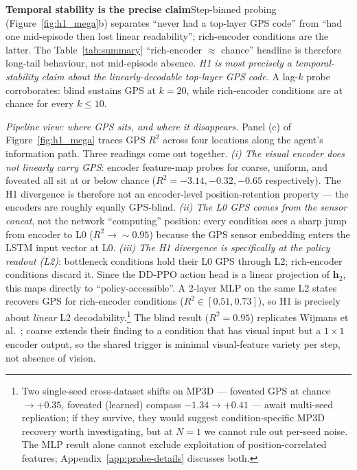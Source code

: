 \documentclass{article}
\newcommand{\pendnote}[1]{\footnote{\color{uncertaincol}\small #1}}
\begin{document}
\noindent\textbf{Temporal stability is the precise claim}\quad Step-binned probing (Figure~\ref{fig:h1_mega}b) separates ``never had a top-layer GPS code'' from ``had one mid-episode then lost linear readability''; rich-encoder conditions are the latter. The Table~\ref{tab:summary} ``rich-encoder $\approx$ chance'' headline is therefore long-tail behaviour, not mid-episode absence. \emph{H1 is most precisely a temporal-stability claim about the linearly-decodable top-layer GPS code.} A lag-$k$ probe corroborates: blind sustains GPS at $k=20$, while rich-encoder conditions are at chance for every $k \leq 10$.

\emph{Pipeline view: where GPS sits, and where it disappears.} Panel (c) of Figure~\ref{fig:h1_mega} traces GPS $R^2$ across four locations along the agent's information path. Three readings come out together. \emph{(i) The visual encoder does not linearly carry GPS}: encoder feature-map probes for coarse, uniform, and foveated all sit at or below chance ($R^2 = -3.14, -0.32, -0.65$ respectively). The H1 divergence is therefore not an encoder-level position-retention property --- the encoders are roughly equally GPS-blind. \emph{(ii) The L0 GPS comes from the sensor concat}, not the network ``computing'' position: every condition sees a sharp jump from encoder to L0 ($R^2 \to \sim 0.95$) because the GPS sensor embedding enters the LSTM input vector at L0. \emph{(iii) The H1 divergence is specifically at the policy readout (L2)}: bottleneck conditions hold their L0 GPS through L2; rich-encoder conditions discard it. Since the DD-PPO action head is a linear projection of $\mathbf{h}_2$, this maps directly to ``policy-accessible''. A 2-layer MLP on the same L2 states recovers GPS for rich-encoder conditions ($R^2 \in [0.51, 0.73]$), so H1 is precisely about \emph{linear} L2 decodability.\pendnote{Two single-seed cross-dataset shifts on MP3D --- foveated GPS at chance $\to +0.35$, foveated (learned) compass $-1.34 \to +0.41$ --- await multi-seed replication; if they survive, they would suggest condition-specific MP3D recovery worth investigating, but at $N=1$ we cannot rule out per-seed noise. The MLP result alone cannot exclude exploitation of position-correlated features; Appendix~\ref{app:probe-details} discusses both.} The blind result ($R^2 = 0.95$) replicates Wijmans et al.~\citep{wijmans2023emergence}; coarse extends their finding to a condition that has visual input but a $1{\times}1$ encoder output, so the shared trigger is minimal visual-feature variety per step, not absence of vision.
\end{document}
